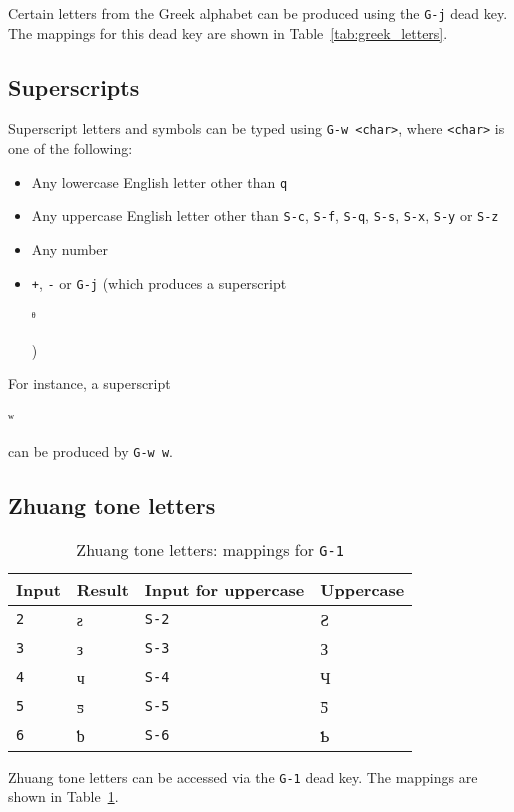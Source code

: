 \documentclass[oneside]{memoir}
\newcommand{\key}{\verb}
\newcommand{\keynv}{\texttt}
\newcommand{\out}[1]{\colorbox{gray!20}{\strut{}#1}}
\begin{document}
Certain letters from the Greek alphabet can be produced using the \key|G-j| dead key.
The mappings for this dead key are shown in Table~\ref{tab:greek_letters}.

\subsection{Superscripts}
\label{sec:superscripts}

Superscript letters and symbols can be typed using \key|G-w <char>|, where \key|<char>| is one of the following:
\begin{itemize}[noitemsep]
\item Any lowercase English letter other than \key|q|
\item Any uppercase English letter other than \key|S-c|, \key|S-f|, \key|S-q|, \key|S-s|, \key|S-x|, \key|S-y| or \key|S-z|
\item Any number
\item \key|+|, \key|-| or \key|G-j| (which produces a superscript \out{ᶿ})
\end{itemize}
For instance, a superscript \out{ʷ} can be produced by \key|G-w w|.

\subsection{Zhuang tone letters}
\label{sec:zhuang_tones}

\begin{table}[b]
\caption{Zhuang tone letters: mappings for \keynv{G-1}}
\label{tab:zhuang_tones}
\centering
\begin{tabular}{llll}
\toprule
Input & Result & Input for uppercase & Uppercase \\
\midrule
\key|2| & ƨ & \key|S-2| & Ƨ \\
\key|3| & з & \key|S-3| & З \\
\key|4| & ч & \key|S-4| & Ч \\
\key|5| & ƽ & \key|S-5| & Ƽ \\
\key|6| & ƅ & \key|S-6| & Ƅ \\
\end{tabular}
\end{table}

Zhuang tone letters can be accessed via the \key|G-1| dead key.
The mappings are shown in Table~\ref{tab:zhuang_tones}.
\end{document}
